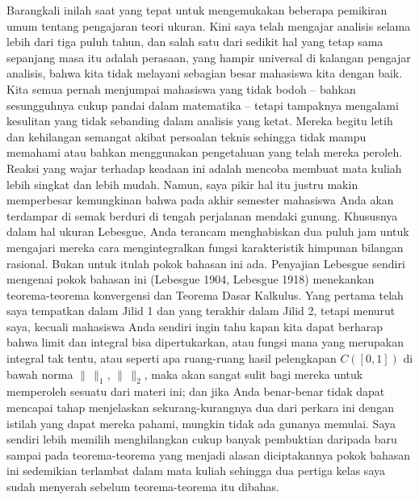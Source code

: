 Barangkali inilah saat yang tepat untuk mengemukakan beberapa pemikiran
umum tentang pengajaran teori ukuran. Kini saya telah mengajar analisis
selama lebih dari tiga puluh tahun, dan salah satu dari sedikit hal yang
tetap sama sepanjang masa itu adalah perasaan, yang hampir universal di
kalangan pengajar analisis, bahwa kita tidak melayani sebagian besar
mahasiswa kita dengan baik. Kita semua pernah menjumpai mahasiswa yang
tidak bodoh -- bahkan sesungguhnya cukup pandai dalam matematika --
tetapi tampaknya mengalami kesulitan yang tidak sebanding dalam analisis
yang ketat. Mereka begitu letih dan kehilangan semangat akibat persoalan
teknis sehingga tidak mampu memahami atau bahkan menggunakan pengetahuan
yang telah mereka peroleh. Reaksi yang wajar terhadap keadaan ini adalah
mencoba membuat mata kuliah lebih singkat dan lebih mudah. Namun, saya
pikir hal itu justru makin memperbesar kemungkinan bahwa pada akhir
semester mahasiswa Anda akan terdampar di semak berduri di tengah
perjalanan mendaki gunung. Khususnya dalam hal ukuran Lebesgue, Anda
terancam menghabiskan dua puluh jam untuk mengajari mereka cara
mengintegralkan fungsi karakteristik himpunan bilangan rasional. Bukan untuk
itulah pokok bahasan ini ada. Penyajian Lebesgue sendiri mengenai pokok
bahasan ini ({\smc Lebesgue 1904}, {\smc Lebesgue 1918}) menekankan
teorema-teorema konvergensi dan Teorema Dasar Kalkulus. Yang pertama telah
saya tempatkan dalam Jilid 1 dan yang terakhir dalam Jilid 2, tetapi menurut
saya, kecuali mahasiswa Anda sendiri ingin tahu kapan kita dapat berharap
bahwa limit dan integral bisa dipertukarkan, atau
fungsi mana yang merupakan integral tak tentu, atau seperti apa
ruang-ruang hasil pelengkapan $C([0,1])$ di bawah norma
$\|\,\|_1$,  $\|\,\|_2$, maka
akan sangat sulit bagi mereka untuk memperoleh sesuatu dari materi ini;
dan jika Anda benar-benar tidak dapat mencapai tahap menjelaskan
sekurang-kurangnya dua dari perkara ini dengan istilah yang dapat mereka
pahami, mungkin tidak ada gunanya memulai. Saya sendiri lebih memilih
menghilangkan cukup banyak pembuktian daripada baru sampai pada
teorema-teorema yang menjadi alasan diciptakannya pokok bahasan ini
sedemikian terlambat dalam mata kuliah sehingga dua pertiga kelas saya
sudah menyerah sebelum teorema-teorema itu dibahas.

